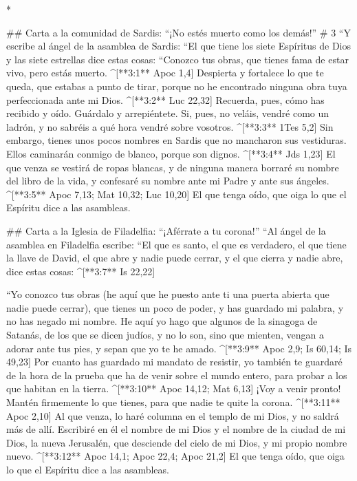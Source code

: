 \begin{paracols}{2}
\begin{english}
\end{english}
\switchcolumn[0]*

## Carta a la comunidad de Sardis: “¡No estés muerto como los demás!”
# 3
 “Y escribe al ángel de la asamblea de Sardis: “El que tiene los siete Espíritus de Dios y las siete estrellas dice estas cosas: “Conozco tus obras, que tienes fama de estar vivo, pero estás muerto. ^[**3:1** Apoc 1,4]  Despierta y fortalece lo que te queda, que estabas a punto de tirar, porque no he encontrado ninguna obra tuya perfeccionada ante mi Dios. ^[**3:2** Luc 22,32]  Recuerda, pues, cómo has recibido y oído. Guárdalo y arrepiéntete. Si, pues, no veláis, vendré como un ladrón, y no sabréis a qué hora vendré sobre vosotros. ^[**3:3** 1Tes 5,2]  Sin embargo, tienes unos pocos nombres en Sardis que no mancharon sus vestiduras. Ellos caminarán conmigo de blanco, porque son dignos. ^[**3:4** Jds 1,23]  El que venza se vestirá de ropas blancas, y de ninguna manera borraré su nombre del libro de la vida, y confesaré su nombre ante mi Padre y ante sus ángeles. ^[**3:5** Apoc 7,13; Mat 10,32; Luc 10,20]  El que tenga oído, que oiga lo que el Espíritu dice a las asambleas.

## Carta a la Iglesia de Filadelfia: “¡Aférrate a tu corona!”
 “Al ángel de la asamblea en Filadelfia escribe: “El que es santo, el que es verdadero, el que tiene la llave de David, el que abre y nadie puede cerrar, y el que cierra y nadie abre, dice estas cosas: ^[**3:7** Is 22,22]

 “Yo conozco tus obras (he aquí que he puesto ante ti una puerta abierta que nadie puede cerrar), que tienes un poco de poder, y has guardado mi palabra, y no has negado mi nombre.  He aquí yo hago que algunos de la sinagoga de Satanás, de los que se dicen judíos, y no lo son, sino que mienten, vengan a adorar ante tus pies, y sepan que yo te he amado. ^[**3:9** Apoc 2,9; Is 60,14; Is 49,23]  Por cuanto has guardado mi mandato de resistir, yo también te guardaré de la hora de la prueba que ha de venir sobre el mundo entero, para probar a los que habitan en la tierra. ^[**3:10** Apoc 14,12; Mat 6,13]  ¡Voy a venir pronto! Mantén firmemente lo que tienes, para que nadie te quite la corona. ^[**3:11** Apoc 2,10]  Al que venza, lo haré columna en el templo de mi Dios, y no saldrá más de allí. Escribiré en él el nombre de mi Dios y el nombre de la ciudad de mi Dios, la nueva Jerusalén, que desciende del cielo de mi Dios, y mi propio nombre nuevo. ^[**3:12** Apoc 14,1; Apoc 22,4; Apoc 21,2]  El que tenga oído, que oiga lo que el Espíritu dice a las asambleas.


\end{paracols}
